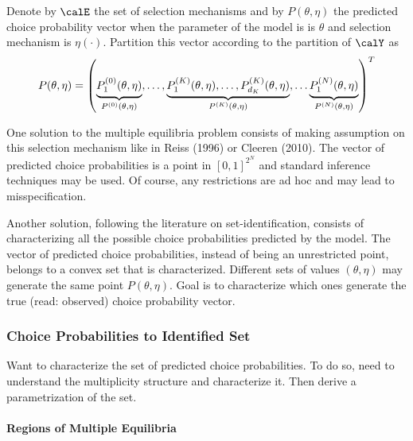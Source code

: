 Denote by $\calE$ the set of selection mechanisms and by \(P(\theta,\eta)\) the predicted choice probability vector when the parameter of the model is is \(\theta\) and selection mechanism is $\eta(\cdot)$. Partition this vector according to the partition of $\calY$ as 
\begin{equation}
	\label{eq:BK-2}
	P(\theta,\eta) = \left(\underbrace{\vphantom{,\dots P_{d_k}^{(K)}(\theta,\eta)}P_1^{(0)}(\theta,\eta)}_{P^{(0)}(\theta,\eta)},\dots, \underbrace{P_1^{(K)}(\theta,\eta),\dots, P_{d_K}^{(K)}(\theta,\eta)}_{P^{(K)}(\theta,\eta)},\dots\underbrace{\vphantom{,\dots P_{d_k}^{(K)}}P_1^{(N)}(\theta,\eta)}_{P^{(N)}(\theta,\eta)}\right)^T
\end{equation}

One solution to the multiple equilibria problem consists of making assumption on this selection mechanism like in Reiss (1996) or Cleeren (2010). The vector of predicted choice probabilities is a point in $[0,1]^{2^N}$ and standard inference techniques may be used. Of course, any restrictions are ad hoc and may lead to misspecification. 

Another solution, following the literature on set-identification, consists of characterizing all the possible choice probabilities predicted by the model. The vector of predicted choice probabilities, instead of being an unrestricted point, belongs to a convex set that is characterized. Different sets of values $(\theta, \eta)$ may generate the same point $P(\theta,\eta)$. Goal is to characterize which ones generate the true (read: observed) choice probability vector. 

\subsubsection{Choice Probabilities to Identified Set}

Want to characterize the set of predicted choice probabilities. To do so, need to understand the multiplicity structure and characterize it. Then derive a parametrization of the set. 

\paragraph{Regions of Multiple Equilibria}


